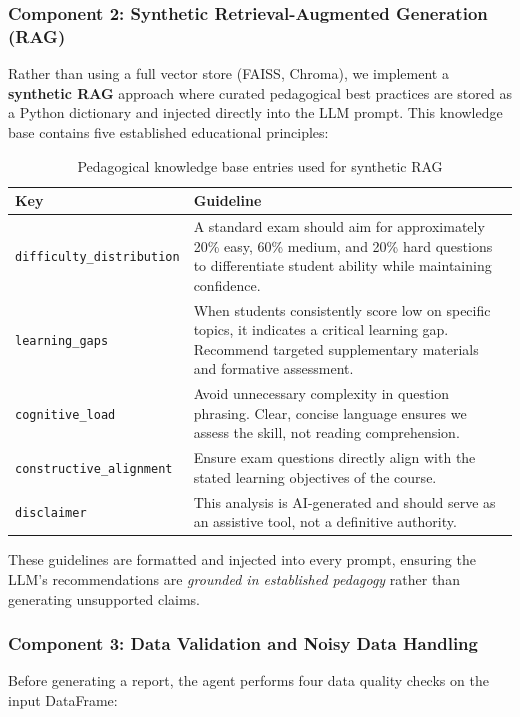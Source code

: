 \documentclass[12pt, a4paper]{article}
\begin{document}
\subsubsection{Component 2: Synthetic Retrieval-Augmented Generation (RAG)}

Rather than using a full vector store (FAISS, Chroma), we implement a \textbf{synthetic RAG} approach where curated pedagogical best practices are stored as a Python dictionary and injected directly into the LLM prompt. This knowledge base contains five established educational principles:

\begin{table}[H]
\centering
\caption{Pedagogical knowledge base entries used for synthetic RAG}
\label{tab:rag-kb}
\begin{tabularx}{\textwidth}{lX}
\toprule
\textbf{Key} & \textbf{Guideline} \\
\midrule
\texttt{difficulty\_distribution} & A standard exam should aim for approximately 20\% easy, 60\% medium, and 20\% hard questions to differentiate student ability while maintaining confidence. \\
\texttt{learning\_gaps} & When students consistently score low on specific topics, it indicates a critical learning gap. Recommend targeted supplementary materials and formative assessment. \\
\texttt{cognitive\_load} & Avoid unnecessary complexity in question phrasing. Clear, concise language ensures we assess the skill, not reading comprehension. \\
\texttt{constructive\_alignment} & Ensure exam questions directly align with the stated learning objectives of the course. \\
\texttt{disclaimer} & This analysis is AI-generated and should serve as an assistive tool, not a definitive authority. \\
\bottomrule
\end{tabularx}
\end{table}

These guidelines are formatted and injected into every prompt, ensuring the LLM's recommendations are \emph{grounded in established pedagogy} rather than generating unsupported claims.

\subsubsection{Component 3: Data Validation and Noisy Data Handling}

Before generating a report, the agent performs four data quality checks on the input DataFrame:
\end{document}
